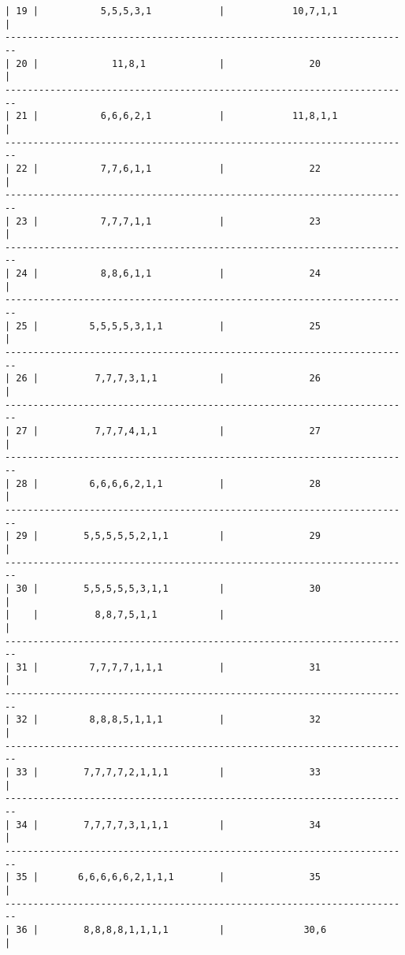 \documentclass[11pt]{article}
\begin{document}
\begin{verbatim}
| 19 |           5,5,5,3,1            |            10,7,1,1            |
------------------------------------------------------------------------
| 20 |             11,8,1             |               20               |
------------------------------------------------------------------------
| 21 |           6,6,6,2,1            |            11,8,1,1            |
------------------------------------------------------------------------
| 22 |           7,7,6,1,1            |               22               |
------------------------------------------------------------------------
| 23 |           7,7,7,1,1            |               23               |
------------------------------------------------------------------------
| 24 |           8,8,6,1,1            |               24               |
------------------------------------------------------------------------
| 25 |         5,5,5,5,3,1,1          |               25               |
------------------------------------------------------------------------
| 26 |          7,7,7,3,1,1           |               26               |
------------------------------------------------------------------------
| 27 |          7,7,7,4,1,1           |               27               |
------------------------------------------------------------------------
| 28 |         6,6,6,6,2,1,1          |               28               |
------------------------------------------------------------------------
| 29 |        5,5,5,5,5,2,1,1         |               29               |
------------------------------------------------------------------------
| 30 |        5,5,5,5,5,3,1,1         |               30               |
|    |          8,8,7,5,1,1           |                                |
------------------------------------------------------------------------
| 31 |         7,7,7,7,1,1,1          |               31               |
------------------------------------------------------------------------
| 32 |         8,8,8,5,1,1,1          |               32               |
------------------------------------------------------------------------
| 33 |        7,7,7,7,2,1,1,1         |               33               |
------------------------------------------------------------------------
| 34 |        7,7,7,7,3,1,1,1         |               34               |
------------------------------------------------------------------------
| 35 |       6,6,6,6,6,2,1,1,1        |               35               |
------------------------------------------------------------------------
| 36 |        8,8,8,8,1,1,1,1         |              30,6              |

\end{verbatim}
\end{document}
